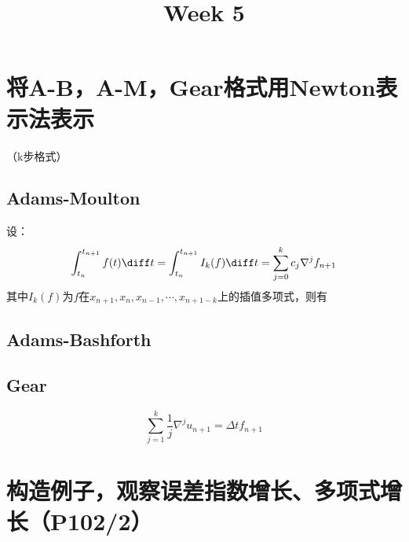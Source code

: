 \documentclass{homework}
\title{Week 5}
\date{}
\begin{document}
\maketitle
\section{将A-B，A-M，Gear格式用Newton表示法表示}
（k步格式）
\subsection{Adams-Moulton}
设：$$\int_{t_n}^{t_{n+1}}f(t)\diff t=\int_{t_n}^{t_{n+1}}I_k(f)\diff t=\sum_{j=0}^kc_j\nabla^jf_{n+1}$$其中$I_k(f)$为$f$在$x_{n+1},x_n,x_{n-1},\cdots,x_{n+1-k}$上的插值多项式，则有
\subsection{Adams-Bashforth}
\subsection{Gear}
$$\sum_{j=1}^k\frac{1}{j}\nabla^ju_{n+1}=\Delta tf_{n+1}$$
\section{构造例子，观察误差指数增长、多项式增长（P102/2）}
\end{document}
